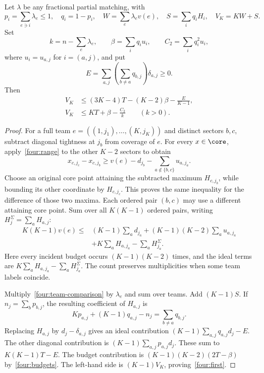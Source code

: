 \begin{lemma}\label{four:aggregate}
Let $\lambda$ be any fractional partial matching, with
\[
 p_i=\sum_{e\ni i}\lambda_e\le1,\quad q_i=1-p_i,\quad
 W=\sum_e\lambda_ev(e),\quad S=\sum_iq_iH_i,\quad V_K=KW+S.
\]
Set
\[
 k=n-\sum_e\lambda_e,\qquad
 \beta=\sum_iq_iu_i,\qquad C_2=\sum_iq_i^2u_i,
\]
where $u_i=u_{a,j}$ for $i=(a,j)$, and put
\[
 E=\sum_{a,j}\left(\sum_{b\ne a}q_{b,j}\right)\delta_{a,j}\ge0.
\]
Then
\begin{align}
 V_K&\le (3K-4)T-(K-2)\beta-\frac{E}{K-1},
        \label{four:first}\\
 V_K&\le KT+\beta-\frac{C_2}{k}\qquad(k>0).
        \label{four:second}
\end{align}
\end{lemma}
\begin{proof}
For a full team $e=((1,j_1),\ldots,(K,j_K))$ and distinct sectors
$b,c$, subtract diagonal tightness at $j_b$ from coverage of $e$.
For every $x\in\core$, apply~\eqref{four:range} to the other $K-2$
sectors to obtain
\[
 x_{c,j_c}-x_{c,j_b}
 \ge v(e)-d_{j_b}-\sum_{a\notin\{b,c\}}u_{a,j_a}.
\]
Choose an original core point attaining the subtracted maximum
$H_{c,j_b}$, while bounding its other coordinate by $H_{c,j_c}$.
This proves the same inequality for the difference of those two maxima.
Each ordered pair $(b,c)$ may use a different attaining core point.
Sum over all $K(K-1)$ ordered pairs, writing
$H_j^\Sigma=\sum_aH_{a,j}$:
\begin{equation}\label{four:team-comparison}
\begin{split}
 K(K-1)v(e)\le{}&(K-1)\sum_a d_{j_a}
       +(K-1)(K-2)\sum_a u_{a,j_a}\\
       &+K\sum_aH_{a,j_a}-\sum_aH_{j_a}^\Sigma.
\end{split}
\end{equation}
Here every incident budget occurs $(K-1)(K-2)$ times, and the ideal
terms are $K\sum_aH_{a,j_a}-\sum_aH_{j_a}^{\Sigma}$.
The count preserves multiplicities when some team labels coincide.

Multiply~\eqref{four:team-comparison} by $\lambda_e$ and sum over
teams. Add $(K-1)S$. If $n_j=\sum_bp_{b,j}$, the resulting coefficient
of $H_{a,j}$ is
\[
       Kp_{a,j}+(K-1)q_{a,j}-n_j
                   =\sum_{b\ne a}q_{b,j}.
\]
Replacing $H_{a,j}$ by $d_j-\delta_{a,j}$ gives an ideal contribution
$(K-1)\sum_{a,j}q_{a,j}d_j-E$. The other diagonal contribution is
$(K-1)\sum_{a,j}p_{a,j}d_j$. These sum to $K(K-1)T-E$.
The budget contribution is
$(K-1)(K-2)(2T-\beta)$ by~\eqref{four:budgets}.
The left-hand side is $(K-1)V_K$, proving~\eqref{four:first}.


\end{proof}
